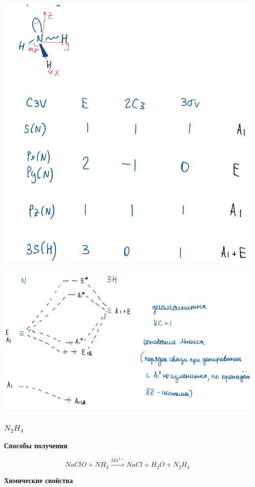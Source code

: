 \includegraphics[scale=0.8]{images/8v2.png}

\includegraphics[scale=0.8]{images/8v3.png}

\subsubsection*{$N_2H_4$}

\textbf{Способы получения}

$$NaClO + NH_3 \xrightarrow{Mn^{2+}} NaCl + H_2O + N_2H_4$$

\textbf{Химические свойства}


